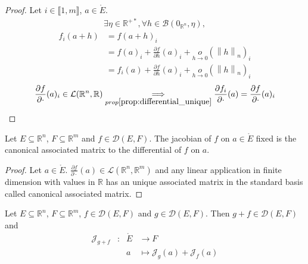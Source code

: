 \documentclass[11pt,en]{elegantpaper}
\newcommand{\norm}[1]{\left\lVert#1\right\rVert}
\newcommand{\Real}{\mathbb{R}}
\begin{document}
\begin{proof}
  Let $i \in \llbracket 1,m \rrbracket$, $a \in \mathring{E}$.
  \begin{equation*}
    \begin{gathered}
      \exists \eta \in \Real^{+*}, \forall h \in \mathcal{B}(0_{\Real^n},\eta),
    \end{gathered}
  \end{equation*}
  \begin{equation*}
    \begin{array}{ll}
      f_i (a + h) & = f(a + h)_i \\
      & = f(a)_i + \frac{\partial f}{\partial h}(a)_i + \underset{h \to 0}o(\norm h _n)_i \\
      & = f_i(a) + \frac{\partial f}{\partial h}(a)_i + \underset{h \to 0}o(\norm h _n)_i
    \end{array}
  \end{equation*}
  \begin{equation*}
    \frac{\partial f}{\partial \cdot}(a)_i \in \mathcal{L}(\Real^n,\Real) \underset{prop\ref{prop:differential_unique}}\implies \frac{\partial f_i}{\partial \cdot}(a) = \frac{\partial f}{\partial \cdot}(a)_i
  \end{equation*}
\end{proof}

\begin{corollary}
  {\normalfont Let $E \subseteq \Real^n$, $F \subseteq \Real^m$ and $f \in \mathcal{D}(E,F)$.
  The jacobian of $f$ on $a \in \mathring{E}$ fixed is the canonical associated matrix to the differential of $f$ on $a$.} \par
   \par
\end{corollary}

\begin{proof}
  Let $a \in \mathring{E}$.
  $\frac{\partial f}{\partial \cdot}(a) \in \mathcal{L}(\Real^n,\Real^m)$ and any linear application in finite dimension
  with values in $\Real$ has an unique associated matrix in the standard basis called canonical associated matrix. \par
\end{proof}

\begin{proposition}\label{prop:jacobians_sum}
  {\normalfont
    Let $E \subseteq \Real^n$, $F \subseteq \Real^m$, $f \in \mathcal{D}(E,F)$ and $g \in \mathcal{D}(E,F)$.
    Then $g + f \in \mathcal{D}(E,F)$ and \begin{equation}
      \begin{array}{llll}
        \mathcal{J}_{g + f} & : & \mathring{E} & \longrightarrow F \\
        &   & a & \longmapsto \mathcal{J}_{g}(a) + \mathcal{J}_{f}(a)
      \end{array}
    \end{equation}
  }
\end{proposition}
\end{document}
